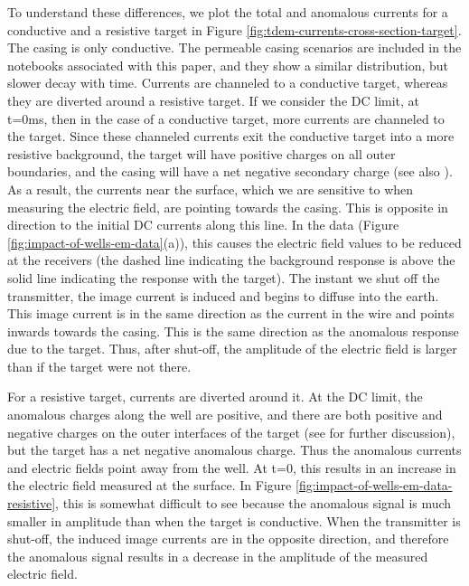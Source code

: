 \documentclass[
    paper
]{geophysics}
\begin{document}
To understand these differences, we plot the total and anomalous currents for a conductive and a resistive target in Figure \ref{fig:tdem-currents-cross-section-target}. The casing is only conductive. The permeable casing scenarios are included in the notebooks associated with this paper, and they show a similar distribution, but slower decay with time. Currents are channeled to a conductive target, whereas they are diverted around a resistive target. If we consider the DC limit, at t=0ms, then in the case of a conductive target, more currents are channeled to the target. Since these channeled currents exit the conductive target into a more resistive background, the target will have positive charges on all outer boundaries, and the casing will have a net negative secondary charge (see also \cite{Weiss2016, Heagy2019}). As a result, the currents near the surface, which we are sensitive to when measuring the electric field, are pointing towards the casing. This is opposite in direction to the initial DC currents along this line. In the data (Figure \ref{fig:impact-of-wells-em-data}(a)), this causes the electric field values to be reduced at the receivers (the dashed line indicating the background response is above the solid line indicating the response with the target). The instant we shut off the transmitter, the image current is induced and begins to diffuse into the earth. This image current is in the same direction as the current in the wire and points inwards towards the casing. This is the same direction as the anomalous response due to the target. Thus, after shut-off, the amplitude of the electric field is larger than if the target were not there.

For a resistive target, currents are diverted around it. At the DC limit, the anomalous charges along the well are positive, and there are both positive and negative charges on the outer interfaces of the target (see \cite{Heagy2019} for further discussion), but the target has a net negative anomalous charge. Thus the anomalous currents and electric fields point away from the well. At t=0, this results in an increase in the electric field measured at the surface. In Figure \ref{fig:impact-of-wells-em-data-resistive}, this is somewhat difficult to see because the anomalous signal is much smaller in amplitude than when the target is conductive. When the transmitter is shut-off, the induced image currents are in the opposite direction, and therefore the anomalous signal results in a decrease in the amplitude of the measured electric field.
\end{document}
